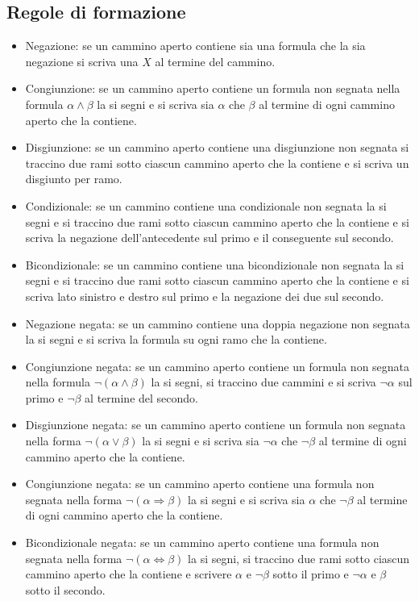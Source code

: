 \subsection{Regole di formazione}
\begin{itemize}
\item Negazione: se un cammino aperto contiene sia una formula che la sia negazione si scriva una $X$ al termine del cammino.
\item Congiunzione: se un cammino aperto contiene un formula non segnata nella formula $\alpha\land\beta$ la si segni e si scriva sia $\alpha$ che $\beta$  al termine di ogni cammino aperto che la contiene.
\item Disgiunzione: se un cammino aperto contiene una disgiunzione non segnata si traccino due rami sotto ciascun cammino aperto che la contiene e si scriva un disgiunto per ramo.
\item Condizionale: se un cammino contiene una condizionale non segnata la si segni e si traccino due rami sotto ciascun cammino aperto che la contiene e si scriva la negazione dell'antecedente sul primo e il 
conseguente sul secondo. 
\item Bicondizionale: se un cammino contiene una bicondizionale non segnata la si segni e si traccino due rami sotto ciascun cammino aperto che la contiene e si scriva lato sinistro e destro sul primo e la 
negazione dei due sul secondo.
\item Negazione negata: se un cammino contiene una doppia negazione non segnata la si segni e si scriva la formula su ogni ramo che la contiene. 
\item Congiunzione negata: se un cammino aperto contiene un formula non segnata nella formula $\neg(\alpha\land\beta)$ la si segni, si traccino due cammini  e si scriva $\neg\alpha$ sul primo e $\neg\beta$ 
al termine del secondo.
\item Disgiunzione negata: se un cammino aperto contiene un formula non segnata nella forma $\neg(\alpha\lor\beta)$ la si segni e si scriva sia $\neg\alpha$ che $\neg\beta$  al termine di ogni cammino 
aperto che la contiene.
\item Congiunzione negata: se un cammino aperto contiene una formula non segnata nella forma $\neg(\alpha\Rightarrow\beta)$ la si segni e si scriva sia $\alpha$ che $\neg\beta$ al termine di ogni cammino 
aperto che la contiene. 
\item Bicondizionale negata: se un cammino aperto contiene una formula non segnata nella forma $\neg(\alpha\Leftrightarrow\beta)$ la si segni, si traccino due rami sotto ciascun cammino aperto che la 
contiene e scrivere $\alpha$ e $\neg\beta$ sotto il primo e $\neg\alpha$ e $\beta$ sotto il secondo. 
\end{itemize}
